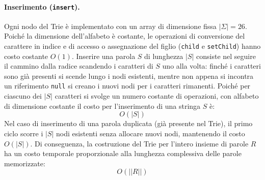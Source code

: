 \documentclass[11pt,a4paper]{article}
\begin{document}
\paragraph{Inserimento (\texttt{insert}).}
Ogni nodo del Trie è implementato con un array di dimensione fissa $|\Sigma| = 26$. Poiché la dimensione dell'alfabeto è costante, le operazioni di conversione del carattere in indice e di accesso o assegnazione del figlio (\texttt{child} e \texttt{setChild}) hanno costo costante $O(1)$.
Inserire una parola $S$ di lunghezza $|S|$ consiste nel seguire il cammino dalla radice scandendo i caratteri di $S$ uno alla volta: finché i caratteri sono già presenti si scende lungo i nodi esistenti, mentre non appena si incontra un riferimento \texttt{null} si creano i nuovi nodi per i caratteri rimanenti. Poiché per ciascuno dei $|S|$ caratteri si svolge un numero costante di operazioni, con alfabeto di dimensione costante il costo per l'inserimento di una stringa $S$ è:
\[
    O(|S|)
\]
Nel caso di inserimento di una parola duplicata (già presente nel Trie), il primo ciclo scorre i $|S|$ nodi esistenti senza allocare nuovi nodi, mantenendo il costo $O(|S|)$. Di conseguenza, la costruzione del Trie per l'intero insieme di parole $R$ ha un costo temporale proporzionale alla lunghezza complessiva delle parole memorizzate:
\[
    O(||R||)
\]
\end{document}
